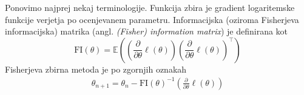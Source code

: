 \documentclass[12pt,a4paper]{amsart}
\theoremstyle{definition} %
\theoremstyle{plain} %
\begin{document}
Ponovimo najprej nekaj terminologije. Funkcija zbira je gradient logaritemske funkcije verjetja po ocenjevanem parametru.
Informacijska (oziroma Fisherjeva informacijska) matrika (angl. \textit{(Fisher) information matrix}) je definirana kot 
\[
    \mathrm{FI}(\theta) = \mathbb{E}\left(\left(\frac{\partial}{\partial\theta} \ell(\theta)\right) \left(\frac{\partial}{\partial\theta} \ell(\theta)\right)^\top \right) %
\]
Fisherjeva zbirna metoda je po zgornjih oznakah 
\begin{align}
    \theta_{n + 1} = \theta_{n} - \mathrm{FI}(\theta)^{-1}\left(\frac{\partial}{\partial\theta} \ell(\theta)\right)
\end{align}
%
\end{document}
